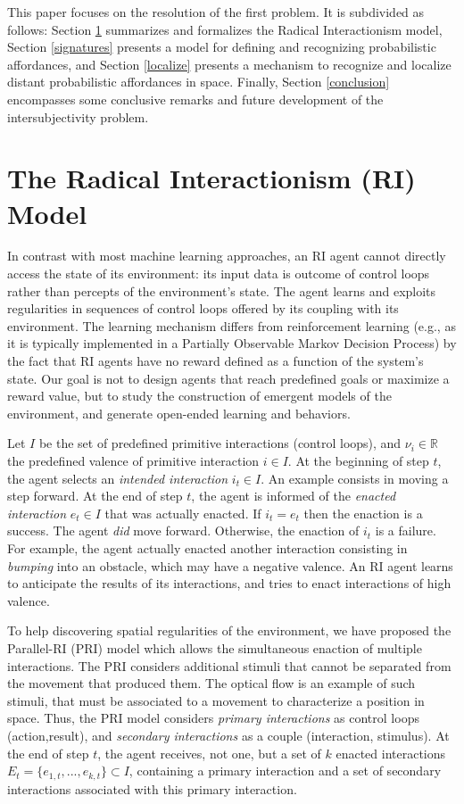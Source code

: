 \documentclass[conference]{IEEEtran}
\makeatletter
\let\cite\relax
\DeclareRobustCommand{\cite}{%
	\let\new@cite@pre\@gobble
	\@ifnextchar[\new@cite{\@citex[]}}
\def\new@cite[#1]{\@ifnextchar[{\new@citea{#1}}{\@citex[#1]}}
\def\new@citea#1{\def\new@cite@pre{#1}\@citex}
\makeatother
\begin{document}
This paper focuses on the resolution of the first problem. 
It is subdivided as follows: Section \ref{RI} summarizes and formalizes the Radical Interactionism model, Section \ref{signatures} presents a model for defining and recognizing probabilistic affordances, and Section \ref{localize} presents a mechanism to recognize and localize distant probabilistic affordances in space. Finally, Section \ref{conclusion} encompasses some conclusive remarks and future development of the intersubjectivity problem.




\section{The Radical Interactionism (RI) Model}\label{RI}

In contrast with most machine learning approaches, an RI agent cannot directly access the state of its environment: its input data is outcome of control loops rather than percepts of the environment's state.
The agent learns and exploits regularities in sequences of control loops offered by its coupling with its environment.
The learning mechanism differs from reinforcement learning (e.g., as it is typically implemented in a Partially Observable Markov Decision Process) by the fact that RI agents have no reward defined as a function of the system's state.
Our goal is not to design agents that reach predefined goals or maximize a reward value, but to study the construction of emergent models of the environment, and generate open-ended learning and behaviors.

Let $I$ be the set of predefined primitive interactions (control loops), and $\nu_i \in \mathbb{R}$ the predefined valence of primitive interaction $i \in I$.
At the beginning of step $t$, the agent selects an \textit{intended interaction} $i_t \in I$.
An example consists in moving a step forward.
At the end of step $t$, the agent is informed of the \textit{enacted interaction} $e_t \in I$ that was actually enacted. 
If $i_t = e_t$ then the enaction is a success. 
The agent \textit{did} move forward.
Otherwise, the enaction of $i_t$ is a failure.
For example, the agent actually enacted another interaction consisting in \textit{bumping} into an obstacle, which may have a negative valence.
An RI agent learns to anticipate the results of its interactions, and tries to enact interactions of high valence.

To help discovering spatial regularities of the environment, we have proposed the Parallel-RI (PRI) model \cite{gay:space} which allows the simultaneous enaction of multiple interactions.
The PRI considers additional stimuli that cannot be separated from the movement that produced them. The optical flow is an example of such stimuli, that must be associated to a movement to characterize a position in space. Thus, the PRI model considers \textit{primary interactions} as control loops (action,result), and \textit{secondary interactions} as a couple (interaction, stimulus).
At the end of step $t$, the agent receives, not one, but a set of $k$ enacted interactions $E_t=\{e_{1,t},..., e_{k,t}\} \subset I$, containing a primary interaction and a set of secondary interactions associated with this primary interaction.
\end{document}

